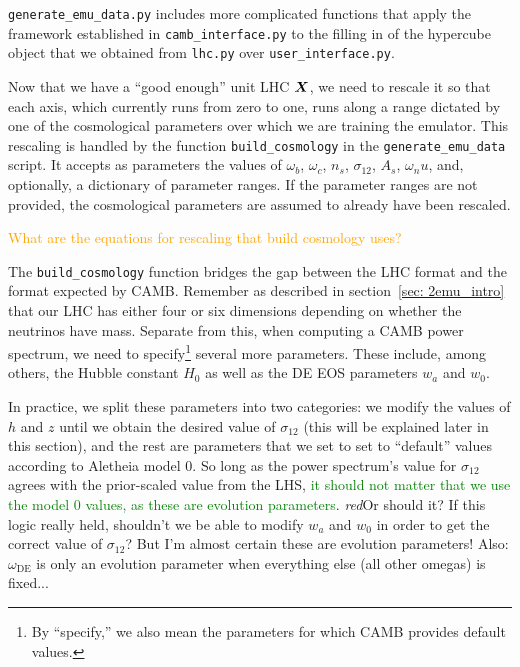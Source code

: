 \verb|generate_emu_data.py| includes more complicated functions that apply the 
framework established in \verb|camb_interface.py| to the filling in of the 
hypercube object that we obtained from \verb|lhc.py| over
\verb|user_interface.py|.


Now that we have a ``good enough'' unit LHC $\bm{X}$, we need to rescale it 
so that each axis, which currently runs from zero to one, runs along a range 
dictated by one of the cosmological parameters over which we are training the 
emulator. This rescaling is handled by the function \verb|build_cosmology| in
the \verb|generate_emu_data| script. It accepts as parameters the values of
$\omega_b$, $\omega_c$, $n_s$, $\sigma_{12}$, $A_s$, $\omega_nu$, and, 
optionally, a dictionary of parameter ranges. If the
parameter ranges are not provided, the cosmological parameters are assumed to
already have been rescaled. 

\textcolor{orange}{What are the equations for rescaling that build cosmology
uses?}

The \verb|build_cosmology| function bridges the gap between the LHC format and 
the format expected by CAMB. Remember as described in
section~\ref{sec: 2emu_intro} that our LHC has either four or six dimensions 
depending on whether the neutrinos have mass. Separate from this, when 
computing a CAMB power spectrum, we need to
specify\footnote{By ``specify,'' we also mean the parameters for which CAMB
provides default values.}
several more parameters. These include, among others, the Hubble constant 
$H_0$ as well as the DE EOS parameters $w_a$ and $w_0$.

In practice, we split these parameters into two categories: we modify the
values of $h$ and $z$ until we obtain the desired value of $\sigma_{12}$
(this will be explained later in this section), and the rest are parameters
that we set to set to ``default'' values according to Aletheia model 0.
So long as the power spectrum's value for $\sigma_{12}$ agrees with the
prior-scaled value from the LHS, \textcolor{green}{it should not matter that 
we use the model 0 values, as these are evolution parameters}.
\textit{red}{Or should it? If this logic really held, shouldn't we be able to 
modify $w_a$ and $w_0$ in order to get the correct value of $\sigma_{12}$? But
I'm almost certain these are evolution parameters! Also: $\omega_\text{DE}$
is only an evolution parameter when everything else (all other omegas) is 
fixed...}

